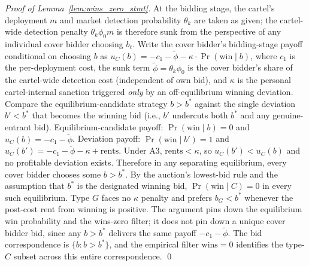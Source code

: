 \begin{proof}[Proof of Lemma~\ref{lem:wins_zero_stmt}]
At the bidding stage, the cartel's deployment $m$ and market
detection probability $\theta_k$ are taken as given; the
cartel-wide detection penalty $\theta_k \phi_0 m$ is therefore
sunk from the perspective of any individual cover bidder
choosing $b_\ell$. Write the cover bidder's bidding-stage payoff
conditional on choosing $b$ as
$u_C(b) = -c_1 - \tilde{\phi} - \kappa \cdot \Pr(\text{win}
\mid b)$, where $c_1$ is the per-deployment cost, the sunk term
$\tilde{\phi} = \theta_k \phi_0$ is the cover bidder's share of
the cartel-wide detection cost (independent of own bid), and
$\kappa$ is the personal cartel-internal sanction triggered
\emph{only} by an off-equilibrium winning deviation. Compare
the equilibrium-candidate strategy $b > b^*$ against the
single deviation $b' < b^*$ that becomes the winning bid (i.e.,
$b'$ undercuts both $b^*$ and any genuine-entrant bid).
Equilibrium-candidate payoff: $\Pr(\text{win} \mid b) = 0$ and
$u_C(b) = -c_1 - \tilde{\phi}$. Deviation payoff:
$\Pr(\text{win} \mid b') = 1$ and
$u_C(b') = -c_1 - \tilde{\phi} - \kappa + \mathrm{rents}$. Under
A3, $\mathrm{rents} < \kappa$, so $u_C(b') < u_C(b)$ and no
profitable deviation exists. Therefore in any separating
equilibrium, every cover bidder chooses some $b > b^*$. By the
auction's lowest-bid rule and the assumption that $b^*$ is the
designated winning bid, $\Pr(\text{win} \mid C) = 0$ in every
such equilibrium. Type $G$ faces no $\kappa$ penalty and prefers
$b_G < b^*$ whenever the post-cost rent from winning is
positive. The argument pins down the equilibrium win probability
and the wins-zero filter; it does not pin down a unique cover
bidder bid, since any $b > b^*$ delivers the same payoff
$-c_1 - \tilde{\phi}$. The bid correspondence is $\{b : b > b^*\}$,
and the empirical filter $\text{wins} = 0$ identifies the
type-$C$ subset across this entire correspondence. \qed
\end{proof}

